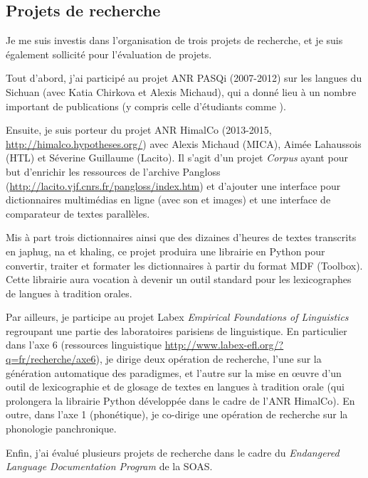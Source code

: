 \documentclass[oldfontcommands,oneside,a4paper,11pt]{article}
\begin{document}
\subsection{Projets de recherche} \label{sec:projets}
Je me suis investis dans l'organisation de trois projets de recherche, et je suis également sollicité pour l'évaluation de projets.

Tout d'abord, j'ai participé au projet ANR PASQi (2007-2012) sur les langues du Sichuan (avec Katia Chirkova et Alexis Michaud), qui a donné lieu à un nombre important de publications (y compris celle d'étudiants comme \citealt{gongxun14agreement}).

Ensuite, je suis porteur du projet ANR HimalCo (2013-2015, \url{http://himalco.hypotheses.org/}) avec Alexis Michaud (MICA), Aimée Lahaussois (HTL) et Séverine Guillaume (Lacito). Il s'agit d'un projet \textit{Corpus} ayant pour but  d'enrichir les ressources de l'archive Pangloss (\url{http://lacito.vjf.cnrs.fr/pangloss/index.htm}) et d'ajouter une interface pour dictionnaires multimédias en ligne (avec son et images) et une interface de comparateur de textes parallèles.

Mis à part trois dictionnaires ainsi que des dizaines d'heures de textes transcrits en japhug, na et khaling, ce projet produira une librairie en Python pour convertir, traiter et formater les dictionnaires à partir du format MDF (Toolbox). Cette librairie aura vocation à devenir un outil standard pour les lexicographes de langues à tradition orales.

Par ailleurs, je participe au projet Labex \textit{Empirical Foundations of Linguistics} regroupant une partie des laboratoires parisiens de linguistique. En particulier dans l'axe 6 (ressources linguistique \url{http://www.labex-efl.org/?q=fr/recherche/axe6}),  je dirige deux opération de recherche, l'une sur la génération automatique des paradigmes, et l'autre sur la mise en œuvre d'un outil de lexicographie et de glosage de textes en langues à tradition orale (qui prolongera la librairie Python développée dans le cadre de l'ANR HimalCo).  En outre, dans l'axe 1 (phonétique),  je co-dirige une opération de recherche sur la phonologie panchronique.


Enfin, j'ai évalué  plusieurs projets de recherche dans le cadre du \textit{Endangered Language Documentation Program} de la SOAS.



 
\end{document}
